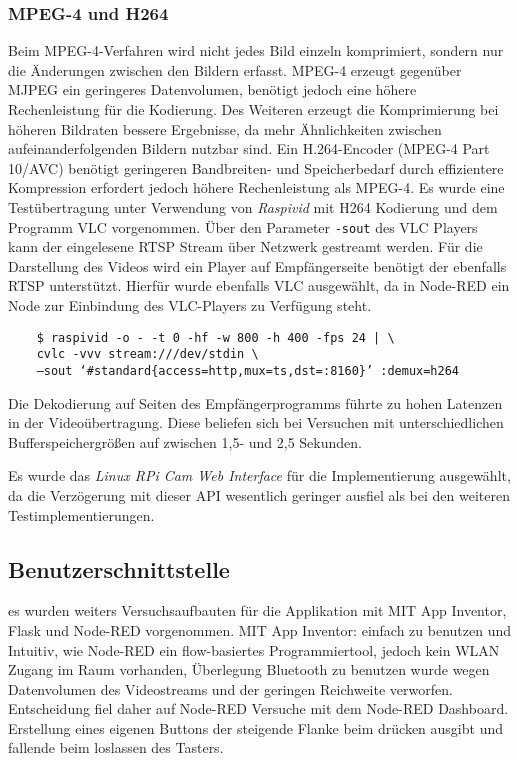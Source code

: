 \documentclass[BMR,Bachelor,ngerman]{twbook}%
\begin{document}
\subsubsection{\ac{MPEG}-4 und H264} Beim MPEG-4-Verfahren wird nicht jedes Bild einzeln komprimiert, sondern nur die Änderungen zwischen den Bildern erfasst. MPEG-4 erzeugt gegenüber \ac{MJPEG} ein geringeres Datenvolumen, benötigt jedoch eine höhere Rechenleistung für die Kodierung. Des Weiteren erzeugt die Komprimierung bei höheren Bildraten bessere Ergebnisse, da mehr Ähnlichkeiten zwischen aufeinanderfolgenden Bildern nutzbar sind. Ein H.264-Encoder (MPEG-4 Part 10/AVC) benötigt geringeren Bandbreiten- und Speicherbedarf durch effizientere Kompression erfordert jedoch höhere Rechenleistung als MPEG-4. Es wurde eine Testübertragung unter Verwendung von \emph{Raspivid} mit H264 Kodierung und dem Programm VLC vorgenommen. Über den Parameter \verb+-sout+ des VLC Players kann der eingelesene \ac{RTSP} Stream über Netzwerk gestreamt werden. Für die Darstellung des Videos wird ein Player auf Empfängerseite benötigt der ebenfalls \ac{RTSP} unterstützt. Hierfür wurde ebenfalls VLC ausgewählt, da in Node-RED ein Node zur Einbindung des VLC-Players zu Verfügung steht.  
\begin{verbatim}
	$ raspivid -o - -t 0 -hf -w 800 -h 400 -fps 24 | \ 
	cvlc -vvv stream:///dev/stdin \
	—sout ‘#standard{access=http,mux=ts,dst=:8160}’ :demux=h264
\end{verbatim}
Die Dekodierung auf Seiten des Empfängerprogramms führte zu hohen Latenzen in der Videoübertragung. Diese beliefen sich bei Versuchen mit unterschiedlichen Bufferspeichergrößen auf zwischen 1,5- und 2,5 Sekunden.
\\\par Es wurde das \emph{Linux RPi Cam Web Interface} für die Implementierung ausgewählt, da die Verzögerung mit dieser \ac{API} wesentlich geringer ausfiel als bei den weiteren Testimplementierungen.
%
\subsection{Benutzerschnittstelle}
es wurden weiters Versuchsaufbauten für die Applikation mit MIT App Inventor, Flask und Node-RED vorgenommen. 
MIT App Inventor: einfach zu benutzen und Intuitiv, wie Node-RED ein flow-basiertes Programmiertool, jedoch kein WLAN Zugang im Raum vorhanden, Überlegung Bluetooth zu benutzen wurde wegen Datenvolumen des Videostreams und der geringen Reichweite verworfen. Entscheidung fiel daher auf Node-RED
Versuche mit dem Node-RED Dashboard. Erstellung eines eigenen Buttons der steigende Flanke beim drücken ausgibt und fallende beim loslassen des Tasters. 
%
\end{document}
